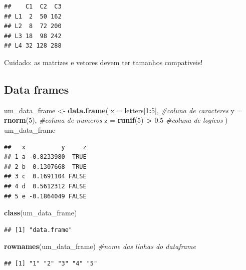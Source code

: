 \documentclass[
]{book}
\newenvironment{Shaded}{\begin{snugshade}}{\end{snugshade}}
\newcommand{\AttributeTok}[1]{\textcolor[rgb]{0.13,0.29,0.53}{#1}}
\newcommand{\CommentTok}[1]{\textcolor[rgb]{0.56,0.35,0.01}{\textit{#1}}}
\newcommand{\DecValTok}[1]{\textcolor[rgb]{0.00,0.00,0.81}{#1}}
\newcommand{\FloatTok}[1]{\textcolor[rgb]{0.00,0.00,0.81}{#1}}
\newcommand{\FunctionTok}[1]{\textcolor[rgb]{0.13,0.29,0.53}{\textbf{#1}}}
\newcommand{\NormalTok}[1]{#1}
\newcommand{\OtherTok}[1]{\textcolor[rgb]{0.56,0.35,0.01}{#1}}
\newcommand{\SpecialCharTok}[1]{\textcolor[rgb]{0.81,0.36,0.00}{\textbf{#1}}}
\begin{document}
\begin{verbatim}
##    C1  C2  C3
## L1  2  50 162
## L2  8  72 200
## L3 18  98 242
## L4 32 128 288
\end{verbatim}

Cuidado: as matrizes e vetores devem ter tamanhos compativeis!

\subsection{Data frames}\label{data-frames}

\begin{Shaded}
\begin{Highlighting}[]
\NormalTok{um\_data\_frame }\OtherTok{\textless{}{-}} \FunctionTok{data.frame}\NormalTok{(}
  \AttributeTok{x =}\NormalTok{ letters[}\DecValTok{1}\SpecialCharTok{:}\DecValTok{5}\NormalTok{],       }\CommentTok{\#coluna de caracteres}
  \AttributeTok{y =} \FunctionTok{rnorm}\NormalTok{(}\DecValTok{5}\NormalTok{),           }\CommentTok{\#coluna de numeros}
  \AttributeTok{z =} \FunctionTok{runif}\NormalTok{(}\DecValTok{5}\NormalTok{) }\SpecialCharTok{\textgreater{}} \FloatTok{0.5}      \CommentTok{\#coluna de logicos}
\NormalTok{)}
\NormalTok{um\_data\_frame}
\end{Highlighting}
\end{Shaded}

\begin{verbatim}
##   x          y     z
## 1 a -0.8233980  TRUE
## 2 b  0.1307668  TRUE
## 3 c  0.1691104 FALSE
## 4 d  0.5612312 FALSE
## 5 e -0.1864049 FALSE
\end{verbatim}

\begin{Shaded}
\begin{Highlighting}[]
\FunctionTok{class}\NormalTok{(um\_data\_frame)}
\end{Highlighting}
\end{Shaded}

\begin{verbatim}
## [1] "data.frame"
\end{verbatim}

\begin{Shaded}
\begin{Highlighting}[]
\FunctionTok{rownames}\NormalTok{(um\_data\_frame) }\CommentTok{\#nome das linhas do dataframe}
\end{Highlighting}
\end{Shaded}

\begin{verbatim}
## [1] "1" "2" "3" "4" "5"
\end{verbatim}
\end{document}
